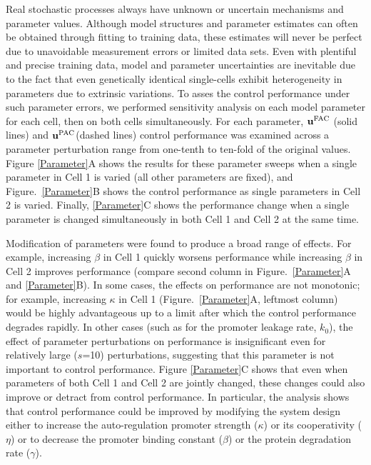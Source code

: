 \documentclass[12pt]{iopart}
\begin{document}
Real stochastic processes always have unknown or uncertain mechanisms and parameter values. Although model structures and parameter estimates can often be obtained through fitting to training data, these estimates will never be perfect due to unavoidable measurement errors or limited data sets. 
Even with plentiful and precise training data, model and parameter uncertainties are inevitable due to the fact that even genetically identical single-cells exhibit heterogeneity in parameters due to extrinsic variations.
To asses the control performance under such parameter errors, we performed sensitivity analysis on each model parameter for each cell, then on both cells simultaneously. 
For each parameter, $\mathbf{u}^{\rm FAC}$ (solid lines) and $\mathbf{u}^{\rm PAC}$(dashed lines) control performance was examined across a parameter perturbation range from one-tenth to ten-fold of the original values.
Figure \ref{Parameter}A shows the results for these parameter sweeps when a single parameter in Cell 1 is varied (all other parameters are fixed), and Figure.\ \ref{Parameter}B shows the control performance as single parameters in Cell 2 is varied. 
Finally, \ref{Parameter}C shows the performance change when a single parameter is changed simultaneously in both Cell 1 and Cell 2 at the same time.

Modification of parameters were found to produce a broad range of effects. 
For example, increasing $\beta$ in Cell 1 quickly worsens performance while increasing $\beta$ in Cell 2 improves performance (compare second column in Figure.\ \ref{Parameter}A and \ref{Parameter}B). 
In some cases, the effects on performance are not monotonic; for example, increasing $\kappa$ in Cell 1 (Figure.\ \ref{Parameter}A, leftmost column) would be highly advantageous up to a limit after which the control performance degrades rapidly. 
In other cases (such as for the promoter leakage rate, $k_0$), the effect of parameter perturbations on performance is insignificant even for relatively large ($s$=10) perturbations, suggesting that this parameter is not important to control performance.
Figure \ref{Parameter}C shows that even when parameters of both Cell 1 and Cell 2 are jointly changed, these changes could also improve or detract from control performance. 
In particular, the analysis shows that control performance could be improved by modifying the system design either to increase the auto-regulation promoter strength ($\kappa$) or its cooperativity ($\eta$) or to decrease the promoter binding constant ($\beta$) or the protein degradation rate ($\gamma$). 
\end{document}
